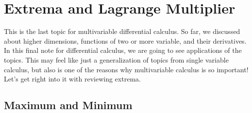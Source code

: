 \documentclass[../../../main.tex]{subfiles}
\begin{document}
\chapter{Extrema and Lagrange Multiplier}

This is the last topic for multivariable differential calculus.
So far, we discussed about higher dimensions, functions of two or more
variable, and their derivatives. In this final note for differential
calculus, we are going to see applications of the topics. This may
feel like just a generalization of topics from single variable
calculus, but also is one of the reasons why multivariable calculus is
so important! Let's get right into it with reviewing extrema.

\section{Maximum and Minimum}
\end{document}
